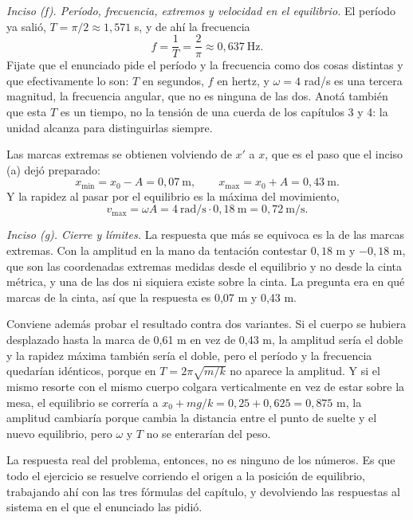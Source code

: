 \documentclass[11pt,openany]{book}
\begin{document}
\begin{ejemplo}[completo]
\medskip
\textit{Inciso (f). Período, frecuencia, extremos y velocidad en el equilibrio.} El período ya salió, $T = \pi/2 \approx 1{,}571$ s, y de ahí la frecuencia
\[
f = \frac{1}{T} = \frac{2}{\pi} \approx 0{,}637\ \mathrm{Hz} .
\]
Fijate que el enunciado pide el período y la frecuencia como dos cosas distintas y que efectivamente lo son: $T$ en segundos, $f$ en hertz, y $\omega = 4$ rad/s es una tercera magnitud, la frecuencia angular, que no es ninguna de las dos. Anotá también que esta $T$ es un tiempo, no la tensión de una cuerda de los capítulos 3 y 4: la unidad alcanza para distinguirlas siempre.

Las marcas extremas se obtienen volviendo de $x'$ a $x$, que es el paso que el inciso (a) dejó preparado:
\[
x_{\min} = x_0 - A = 0{,}07\ \mathrm{m},
\qquad
x_{\max} = x_0 + A = 0{,}43\ \mathrm{m} .
\]
Y la rapidez al pasar por el equilibrio es la máxima del movimiento,
\[
v_{\max} = \omega A = 4\ \mathrm{rad/s} \cdot 0{,}18\ \mathrm{m} = 0{,}72\ \mathrm{m/s} .
\]

\medskip
\textit{Inciso (g). Cierre y límites.} La respuesta que más se equivoca es la de las marcas extremas. Con la amplitud en la mano da tentación contestar $0{,}18$ m y $-0{,}18$ m, que son las coordenadas extremas medidas desde el equilibrio y no desde la cinta métrica, y una de las dos ni siquiera existe sobre la cinta. La pregunta era en qué marcas de la cinta, así que la respuesta es 0,07 m y 0,43 m.

Conviene además probar el resultado contra dos variantes. Si el cuerpo se hubiera desplazado hasta la marca de 0,61 m en vez de 0,43 m, la amplitud sería el doble y la rapidez máxima también sería el doble, pero el período y la frecuencia quedarían idénticos, porque en $T = 2\pi\sqrt{m/k}$ no aparece la amplitud. Y si el mismo resorte con el mismo cuerpo colgara verticalmente en vez de estar sobre la mesa, el equilibrio se correría a $x_0 + mg/k = 0{,}25 + 0{,}625 = 0{,}875$ m, la amplitud cambiaría porque cambia la distancia entre el punto de suelte y el nuevo equilibrio, pero $\omega$ y $T$ no se enterarían del peso.

La respuesta real del problema, entonces, no es ninguno de los números. Es que todo el ejercicio se resuelve corriendo el origen a la posición de equilibrio, trabajando ahí con las tres fórmulas del capítulo, y devolviendo las respuestas al sistema en el que el enunciado las pidió.
\end{ejemplo}
\end{document}
